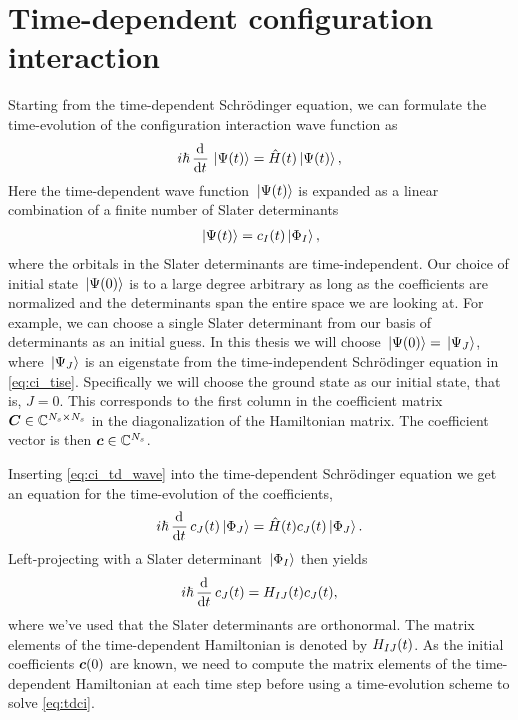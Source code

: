     \section{Time-dependent configuration interaction}
        Starting from the time-dependent Schrödinger equation, we can formulate
        the time-evolution of the configuration interaction wave function as
        \begin{align}
            i\hslash \dod[]{}{t}\ket*{\Psi(t)}
            = \hamil(t)\ket*{\Psi(t)},
            \label{eq:ci_tdse}
        \end{align}
        Here the time-dependent wave function $\ket*{\Psi(t)}$ is expanded as a
        linear combination of a finite number of Slater determinants
        \begin{align}
            \ket*{\Psi(t)} = c_{I}(t) \ket*{\Phi_I},
            \label{eq:ci_td_wave}
        \end{align}
        where the orbitals in the Slater determinants are time-independent.
        Our choice of initial state $\ket*{\Psi(0)}$ is to a large degree
        arbitrary as long as the coefficients are normalized and the
        determinants span the entire space we are looking at.
        For example, we can choose a single Slater determinant from our basis of
        determinants as an initial guess.
        In this thesis we will choose $\ket*{\Psi(0)} = \ket*{\Psi_J}$, where
        $\ket*{\Psi_J}$ is an eigenstate from the time-independent Schrödinger
        equation in \autoref{eq:ci_tise}.
        Specifically we will choose the ground state as our initial state, that
        is, $J = 0$.
        This corresponds to the first column in the coefficient matrix
        $\boldsymbol{C} \in \mathbb{C}^{N_s \times N_s}$ in the diagonalization of the
        Hamiltonian matrix.
        The coefficient vector is then $\boldsymbol{c} \in \mathbb{C}^{N_s}$.

        Inserting \autoref{eq:ci_td_wave} into the time-dependent Schrödinger
        equation we get an equation for the time-evolution of the coefficients,
        \begin{align}
            i\hslash \dod[]{}{t}c_{J}(t)\ket*{\slat_J}
            = \hamil(t) c_{J}(t)\ket*{\slat_J}.
        \end{align}
        Left-projecting with a Slater determinant $\ket*{\Phi_I}$ then yields
        \begin{gather}
            i\hslash \dod[]{}{t}c_{J}(t)
            = \hamilten_{IJ}(t) c_{J}(t),
            \label{eq:tdci}
        \end{gather}
        where we've used that the Slater determinants are orthonormal.
        The matrix elements of the time-dependent Hamiltonian is denoted by
        $H_{IJ}(t)$.
        As the initial coefficients $\boldsymbol{c}(0)$ are known, we need to compute
        the matrix elements of the time-dependent Hamiltonian at each time step
        before using a time-evolution scheme to solve \autoref{eq:tdci}.

\clearemptydoublepage
